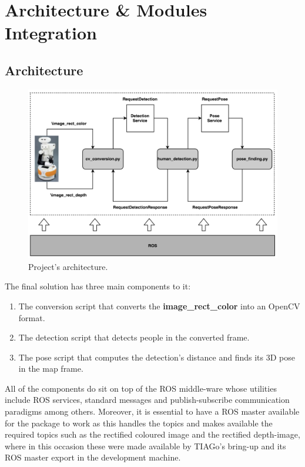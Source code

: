 \chapter{Architecture \& Modules Integration}
\label{chapter5}

\section{Architecture}

\begin{figure}[H]
  \begin{center}
    \includegraphics[width=\linewidth]{images/chapter6_architecture.png}
  \end{center}
  \caption{Project's architecture.}
  \label{fig:architecture}
\end{figure}

The final solution has three main components to it:

\begin{enumerate}
	\item The conversion script that converts the \textbf{image\_rect\_color} into an OpenCV format.
    \item The detection script that detects people in the converted frame.
    \item The pose script that computes the detection's distance and finds its 3D pose in the map frame.
\end{enumerate}

All of the components do sit on top of the ROS middle-ware whose utilities include ROS services, standard messages and publish-subscribe communication paradigms among others. Moreover, it is essential to have a ROS master available for the package to work as this handles the topics and makes available the required topics such as the rectified coloured image and the rectified depth-image, where in this occasion these were made available by TIAGo's bring-up and its ROS master export in the development machine. 


